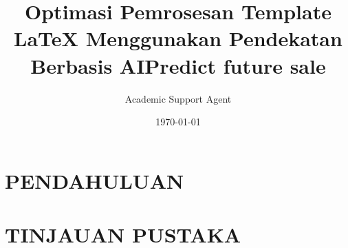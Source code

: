 \documentclass{article}
\title{Optimasi Pemrosesan Template LaTeX Menggunakan Pendekatan Berbasis AI}
\author{Academic Support Agent}
\date{\today}
\begin{document}
\maketitle

\begin{abstract}

\end{abstract}

\chapter{PENDAHULUAN}


\chapter{TINJAUAN PUSTAKA}




\usepackage{arxiv}

\usepackage[utf8]{inputenc} %
\usepackage[T1]{fontenc}    %
\usepackage{hyperref}       %
\usepackage{url}            %
\usepackage{booktabs}       %
\usepackage{amsfonts}       %
\usepackage{nicefrac}       %
\usepackage{microtype}      %
\usepackage{lipsum}
\usepackage{graphicx}
\graphicspath{ {./images/} }


\title{Predict future sale}
\end{document}
